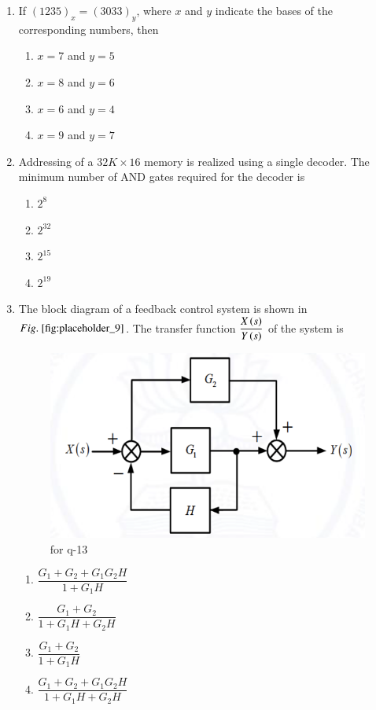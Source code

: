 \documentclass[journal,12pt,onecolumn]{IEEEtran}
\theoremstyle{remark}
\begin{document}
\begin{enumerate}
\item If $(1235)_x = (3033)_y$, where $x$ and $y$ indicate the bases of the corresponding numbers, then
\begin{multicols}{2}
\begin{enumerate}
\item $x = 7$ and $y = 5$
\item $x = 8$ and $y = 6$
\item $x = 6$ and $y = 4$
\item $x = 9$ and $y = 7$
\end{enumerate}
\end{multicols}
\hfill {}

\item Addressing of a $32K \times 16$ memory is realized using a single decoder. The minimum number of AND gates required for the decoder is
\begin{multicols}{4}
\begin{enumerate}
\item $2^8$
\item $2^{32}$
\item $2^{15}$
\item $2^{19}$
\end{enumerate}
\end{multicols}
\hfill {}

\item The block diagram of a feedback control system is shown in $\figref{fig:placeholder_9}$. The transfer function $\dfrac{X\left(s\right)}{Y\left(s\right)}$ of the system is
\begin{figure}[H]
    \centering
    \includegraphics[width=0.4\columnwidth]{figs/9.png}
    \caption{\centering for q-13}
    \label{fig:placeholder_9}
\end{figure}
\begin{multicols}{2}
\begin{enumerate}
\item $\dfrac{G_1 + G_2 + G_1 G_2 H}{1 + G_1 H}$
\item $\dfrac{G_1 + G_2}{1 + G_1 H + G_2 H}$
\item $\dfrac{G_1 + G_2}{1 + G_1 H}$
\item $\dfrac{G_1 + G_2 + G_1 G_2 H}{1 + G_1 H + G_2 H}$
\end{enumerate}
\end{multicols}
\hfill {}


\end{enumerate}
\end{document}
